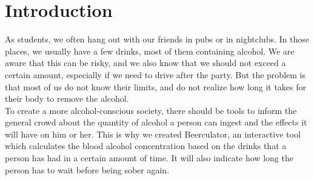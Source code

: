 \section{Introduction}
\label{sec:intro}

As students, we often hang out with our friends in pubs or in nightclubs. In those places, we usually have a few drinks, most of them containing alcohol. We are aware that this can be risky, and we also know that we should not exceed a certain amount, especially if we need to drive after the party. But the problem is that most of us do not know their limits, and do not realize how long it takes for their body to remove the alcohol. \\

To create a more alcohol-conscious society, there should be tools to inform the general crowd about the quantity of alcohol a person can ingest and the effects it will have on him or her. This is why we created Beerculator, an interactive tool which calculates the blood alcohol concentration based on the drinks that a person has had in a certain amount of time. It will also indicate how long the person has to wait before being sober again.

